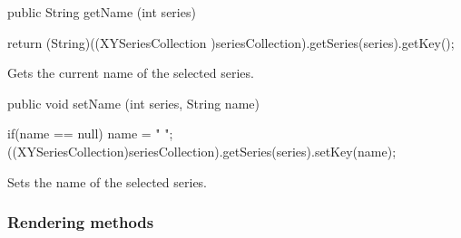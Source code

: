 \begin{htmlonly}
\end{htmlonly}
\begin{code}

   public String getName (int series) \begin{hide} {
      return (String)((XYSeriesCollection )seriesCollection).getSeries(series).getKey();
   }\end{hide}
\end{code}
\begin{tabb}
   Gets the current name of the selected series.
\end{tabb}
\begin{htmlonly}
\end{htmlonly}
\begin{code}

   public void setName (int series, String name) \begin{hide} {
      if(name == null)
         name = " ";
      ((XYSeriesCollection)seriesCollection).getSeries(series).setKey(name);
   }\end{hide}
\end{code}
\begin{tabb}
   Sets the name of the selected series.
\end{tabb}
\begin{htmlonly}
\end{htmlonly}


\newpage
\subsubsection*{Rendering methods}

